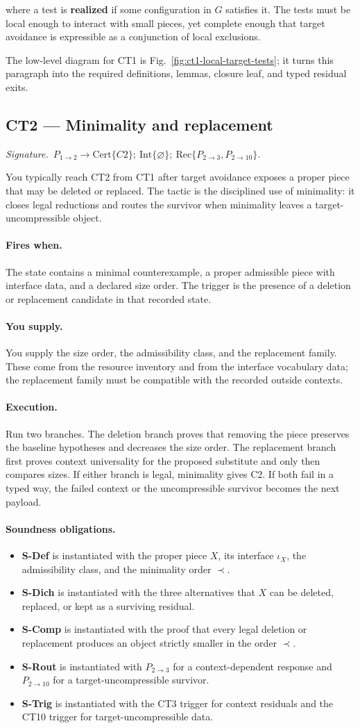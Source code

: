 \documentclass[
  11pt,
]{article}
\providecommand{\tightlist}{%
  \setlength{\itemsep}{0pt}\setlength{\parskip}{0pt}}
\theoremstyle{definition}
\newcommand{\ctsignature}[1]{\par\noindent\emph{Signature.}\ #1\par\medskip}
\newcommand{\ctcert}[1]{\mathrm{Cert}\{#1\}}
\newcommand{\ctint}[1]{\mathrm{Int}\{#1\}}
\newcommand{\ctrec}[1]{\mathrm{Rec}\{#1\}}
\newcommand{\ctnone}{\varnothing}
\newcommand{\ctpar}[1]{\paragraph{#1.}}
\begin{document}
where a test is \textbf{realized} if some configuration in \(G\)
satisfies it. The tests must be local enough to interact with small
pieces, yet complete enough that target avoidance is expressible as a
conjunction of local exclusions.

The low-level diagram for CT1 is Fig.~\ref{fig:ct1-local-target-tests};
it turns this paragraph into the required definitions, lemmas, closure
leaf, and typed residual exits.



\subsection{CT2 --- Minimality and replacement}\label{ct:2}\label{minimal-counterexample}
\ctsignature{\(P_{1\to2}\to \ctcert{C2};\ \ctint{\ctnone};\ \ctrec{P_{2\to3},P_{2\to10}}\).}

You typically reach CT2 from CT1 after target avoidance exposes a proper
piece that may be deleted or replaced.  The tactic is the disciplined use
of minimality: it closes legal reductions and routes the survivor when
minimality leaves a target-uncompressible object.

\ctpar{Fires when}
The state contains a minimal counterexample, a proper admissible piece
with interface data, and a declared size order.  The trigger is the
presence of a deletion or replacement candidate in that recorded state.

\ctpar{You supply}
You supply the size order, the admissibility class, and the replacement
family.  These come from the resource inventory and from the interface
vocabulary data; the replacement family must be compatible with the
recorded outside contexts.

\ctpar{Execution}
Run two branches.  The deletion branch proves that removing the piece
preserves the baseline hypotheses and decreases the size order.  The
replacement branch first proves context universality for the proposed
substitute and only then compares sizes.  If either branch is legal,
minimality gives C2.  If both fail in a typed way, the failed context or
the uncompressible survivor becomes the next payload.

\ctpar{Soundness obligations}
\begin{itemize}
\tightlist
\item \textbf{S-Def} is instantiated with the proper piece \(X\), its interface \(\iota_X\), the admissibility class, and the minimality order \(\prec\).
\item \textbf{S-Dich} is instantiated with the three alternatives that \(X\) can be deleted, replaced, or kept as a surviving residual.
\item \textbf{S-Comp} is instantiated with the proof that every legal deletion or replacement produces an object strictly smaller in the order \(\prec\).
\item \textbf{S-Rout} is instantiated with \(P_{2\to3}\) for a context-dependent response and \(P_{2\to10}\) for a target-uncompressible survivor.
\item \textbf{S-Trig} is instantiated with the CT3 trigger for context residuals and the CT10 trigger for target-uncompressible data.
\end{itemize}
\end{document}
